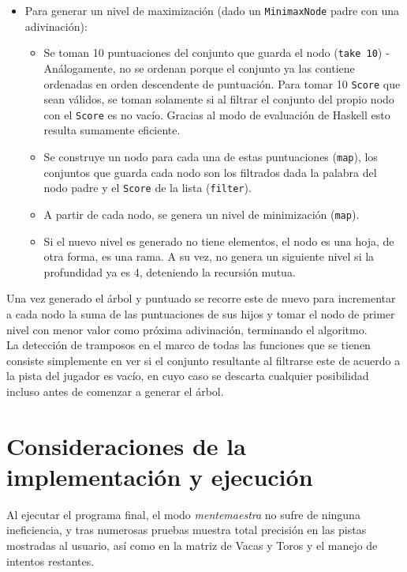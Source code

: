 \documentclass[11pt]{article}
\begin{document}
\begin{itemize}
   \item Para generar un nivel de maximización (dado un \texttt{MinimaxNode} padre con una adivinación):
   \begin{itemize}
      \item Se toman 10 puntuaciones del conjunto que guarda el nodo (\texttt{take 10}) - Análogamente, no se ordenan porque el conjunto ya las contiene ordenadas en orden descendente de puntuación. Para tomar 10 \texttt{Score} que sean válidos, se toman solamente si al filtrar el conjunto del propio nodo con el \texttt{Score} es no vacío. Gracias al modo de evaluación de Haskell esto resulta sumamente eficiente.
      \item Se construye un nodo para cada una de estas puntuaciones (\texttt{map}), los conjuntos que guarda cada nodo son los filtrados dada la palabra del nodo padre y el \texttt{Score} de la lista (\texttt{filter}).
      \item A partir de cada nodo, se genera un nivel de minimización (\texttt{map}).
      \item Si el nuevo nivel es generado no tiene elementos, el nodo es una hoja, de otra forma, es una rama. A su vez, no genera un siguiente nivel si la profundidad ya es 4, deteniendo la recursión mutua.
   \end{itemize}
\end{itemize}

Una vez generado el árbol y puntuado se recorre este de nuevo para incrementar a
cada nodo la suma de las puntuaciones de sus hijos y tomar el nodo de primer nivel
con menor valor como próxima adivinación, terminando el algoritmo. \\

La detección de tramposos en el marco de todas las funciones que se
tienen consiste simplemente en ver si el conjunto resultante al filtrarse este
de acuerdo a la pista del jugador es vacío, en cuyo caso se descarta cualquier
posibilidad incluso antes de comenzar a generar el árbol.

\section{Consideraciones de la implementación y ejecución}

Al ejecutar el programa final, el modo \emph{mentemaestra} no sufre de ninguna ineficiencia,
y tras numerosas pruebas muestra total precisión en las pistas mostradas al usuario,
así como en la matriz de Vacas y Toros y el manejo de intentos restantes. \\
\end{document}

